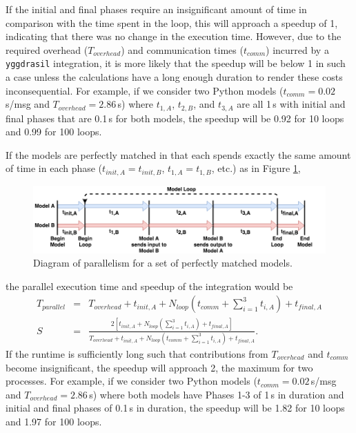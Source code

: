 \documentclass[journal]{IEEEtran}
\newcommand{\pkg}{{\tt yggdrasil}{}}
\begin{document}
%
If the initial and final phases require an insignificant amount of time in comparison with the time spent in the loop, this will approach a speedup of 1, indicating that there was no change in the execution time. However, due to the required overhead ($T_{overhead}$) and communication times ($t_{comm}$) incurred by a {\pkg} integration, it is more likely that the speedup will be below 1 in such a case unless the calculations have a long enough duration to render these costs inconsequential. For example, if we consider two Python models ($t_{comm} = 0.02$\,s/msg and $T_{overhead} = 2.86$\,s) where $t_{1,A}$, $t_{2,B}$, and $t_{3,A}$ are all 1\,s with initial and final phases that are 0.1\,s for both models, the speedup will be 0.92 for 10 loops and 0.99 for 100 loops.

If the models are perfectly matched in that each spends exactly the same amount of time in each phase ($t_{init,A}=t_{init,B}$, $t_{1,A}=t_{1,B}$, etc.) as in Figure \ref{fig:parallel},
%
\ifinclfig
 	\begin{figure}[htbp]
	\begin{center}
	\includegraphics[width=\columnwidth,keepaspectratio]{./images/Parallelism-FullyParallel.png}
	\caption{Diagram of parallelism for a set of perfectly matched models.}
	\label{fig:parallel}
	\end{center}
	\end{figure}
\fi
%
the parallel execution time and speedup of the integration would be
%
\begin{eqnarray}
T_{parallel} & = & T_{overhead} + t_{init,A} + N_{loop}\left(t_{comm} + \sum_{i=1}^{3}t_{i,A}\right) + t_{final, A} \\
S & = & \frac{2\left[t_{init,A} + N_{loop}\left(\sum_{i=1}^{3}t_{i,A}\right) + t_{final, A}\right]}{T_{overhead} + t_{init,A} + N_{loop}\left(t_{comm} + \sum_{i=1}^{3}t_{i,A}\right) + t_{final, A}}.
\end{eqnarray} 
%
If the runtime is sufficiently long such that contributions from $T_{overhead}$ and $t_{comm}$ become insignificant, the speedup will approach 2, the maximum for two processes. For example, if we consider two Python models ($t_{comm} = 0.02$\,s/msg and $T_{overhead} = 2.86$\,s) where both models have Phases 1-3 of 1\,s in duration and initial and final phases of 0.1\,s in duration, the speedup will be 1.82 for 10 loops and 1.97 for 100 loops.
\end{document}
